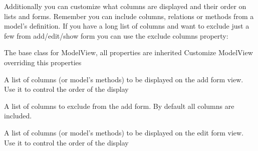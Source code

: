 \documentclass[letterpaper,10pt,english]{sphinxmanual}
\begin{document}
Additionally you can customize what columns are displayed and their order on lists and forms.
Remember you can include columns, relations or methods from a model's definition. If you have a long
list of columns and want to exclude just a few from add/edit/show form you can use the exclude columns
property:
\label{quickhowto:module-flask.ext.appbuilder.baseviews}

\begin{fulllineitems}
\label{quickhowto:flask.ext.appbuilder.baseviews.BaseCRUDView}
The base class for ModelView, all properties are inherited
Customize ModelView overriding this properties

\begin{fulllineitems}
\label{quickhowto:flask.ext.appbuilder.baseviews.BaseCRUDView.add_columns}
A list of columns (or model's methods) to be displayed on the add form view.
Use it to control the order of the display

\end{fulllineitems}


\begin{fulllineitems}
\label{quickhowto:flask.ext.appbuilder.baseviews.BaseCRUDView.add_exclude_columns}
A list of columns to exclude from the add form. By default all columns are included.

\end{fulllineitems}


\begin{fulllineitems}
\label{quickhowto:flask.ext.appbuilder.baseviews.BaseCRUDView.edit_columns}
A list of columns (or model's methods) to be displayed on the edit form view.
Use it to control the order of the display

\end{fulllineitems}


\end{fulllineitems}
\end{document}
